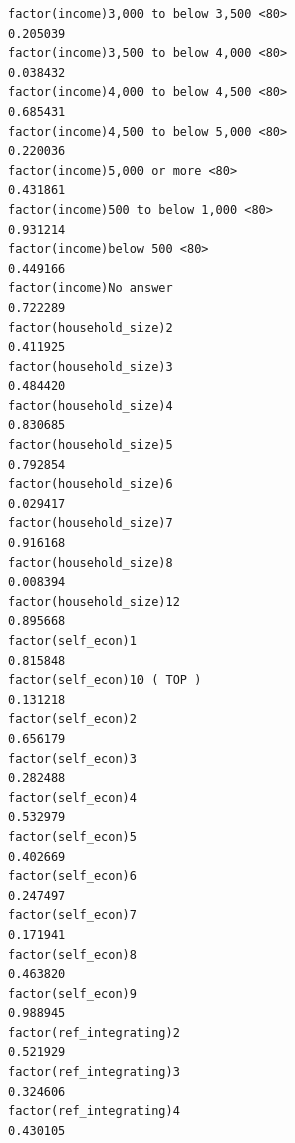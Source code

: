 \documentclass[
]{article}
\begin{document}
\begin{table}
\begin{minipage}[t]{\linewidth}
{\begin{verbatim}
factor(income)3,000 to below 3,500 <80>                                           0.205039
factor(income)3,500 to below 4,000 <80>                                           0.038432
factor(income)4,000 to below 4,500 <80>                                           0.685431
factor(income)4,500 to below 5,000 <80>                                           0.220036
factor(income)5,000 or more <80>                                                  0.431861
factor(income)500 to below 1,000 <80>                                             0.931214
factor(income)below 500 <80>                                                      0.449166
factor(income)No answer                                                           0.722289
factor(household_size)2                                                           0.411925
factor(household_size)3                                                           0.484420
factor(household_size)4                                                           0.830685
factor(household_size)5                                                           0.792854
factor(household_size)6                                                           0.029417
factor(household_size)7                                                           0.916168
factor(household_size)8                                                           0.008394
factor(household_size)12                                                          0.895668
factor(self_econ)1                                                                0.815848
factor(self_econ)10 ( TOP )                                                       0.131218
factor(self_econ)2                                                                0.656179
factor(self_econ)3                                                                0.282488
factor(self_econ)4                                                                0.532979
factor(self_econ)5                                                                0.402669
factor(self_econ)6                                                                0.247497
factor(self_econ)7                                                                0.171941
factor(self_econ)8                                                                0.463820
factor(self_econ)9                                                                0.988945
factor(ref_integrating)2                                                          0.521929
factor(ref_integrating)3                                                          0.324606
factor(ref_integrating)4                                                          0.430105

\end{verbatim}}
\end{minipage}
\end{table}
\end{document}
